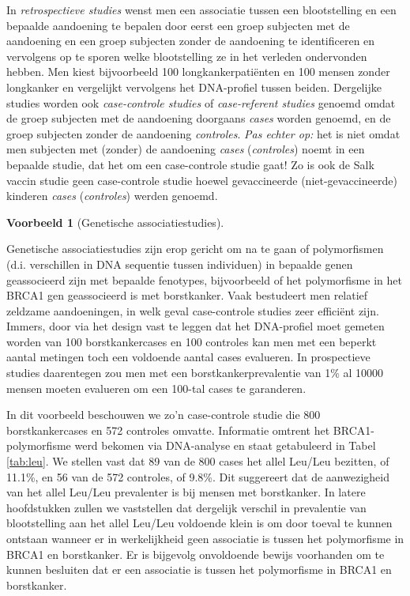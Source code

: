 \documentclass[
  12pt,dutch,coursenotes]{book}
\theoremstyle{definition}
\theoremstyle{definition}
\newtheorem{example}{Voorbeeld}[chapter]
\theoremstyle{definition}
\theoremstyle{definition}
\theoremstyle{remark}
\begin{document}
In \emph{retrospectieve studies} wenst men een associatie tussen een
blootstelling en een bepaalde aandoening te bepalen door eerst een groep
subjecten met de aandoening en een groep subjecten zonder de aandoening te
identificeren en vervolgens op te sporen welke blootstelling ze in het
verleden ondervonden hebben. Men kiest bijvoorbeeld 100
longkankerpatiënten en 100 mensen zonder longkanker en vergelijkt vervolgens het DNA-profiel tussen beiden. Dergelijke studies worden
ook \emph{case-controle studies} of \emph{case-referent studies} genoemd
omdat de groep subjecten met de aandoening doorgaans \emph{cases} worden genoemd,
en de groep subjecten zonder de aandoening \emph{controles}. \emph{Pas echter op:} het is niet omdat men subjecten met (zonder) de aandoening \emph{cases}
(\emph{controles}) noemt in een bepaalde studie, dat het om een case-controle
studie gaat! Zo is ook de Salk vaccin studie geen case-controle studie
hoewel gevaccineerde (niet-gevaccineerde) kinderen \emph{cases} (\emph{controles})
werden genoemd.

\begin{example}[Genetische associatiestudies]
\protect\hypertarget{exm:brcaLeu}{}{\label{exm:brcaLeu} {} }
\end{example}

Genetische associatiestudies zijn erop gericht om na te gaan of polymorfismen (d.i. verschillen in DNA sequentie tussen individuen) in bepaalde genen geassocieerd zijn met bepaalde fenotypes, bijvoorbeeld of het polymorfisme in het BRCA1 gen geassocieerd is met borstkanker. Vaak bestudeert men relatief zeldzame aandoeningen, in welk geval case-controle studies zeer efficiënt zijn. Immers, door via het design vast te leggen dat het DNA-profiel moet gemeten worden van 100 borstkankercases en 100 controles kan men met een beperkt aantal metingen toch een voldoende aantal cases evalueren. In prospectieve studies daarentegen zou men met een borstkankerprevalentie van 1\% al 10000 mensen moeten evalueren om een 100-tal cases te garanderen.

In dit voorbeeld beschouwen we zo'n case-controle studie die 800 borstkankercases en 572 controles omvatte. Informatie omtrent het BRCA1-polymorfisme werd bekomen via DNA-analyse en staat getabuleerd in Tabel \ref{tab:leu}.
We stellen vast dat 89 van de 800 cases het allel Leu/Leu bezitten, of 11.1\%, en 56 van de 572 controles, of 9.8\%. Dit suggereert dat de aanwezigheid van het allel Leu/Leu prevalenter is bij mensen met borstkanker. In latere hoofdstukken zullen
we vaststellen dat dergelijk verschil in prevalentie van blootstelling aan
het allel Leu/Leu voldoende klein is om door toeval te kunnen ontstaan wanneer er in
werkelijkheid geen associatie is tussen het polymorfisme in BRCA1 en borstkanker. Er is bijgevolg onvoldoende bewijs voorhanden om te kunnen besluiten dat er een associatie is tussen het polymorfisme in BRCA1 en borstkanker.
\end{document}
